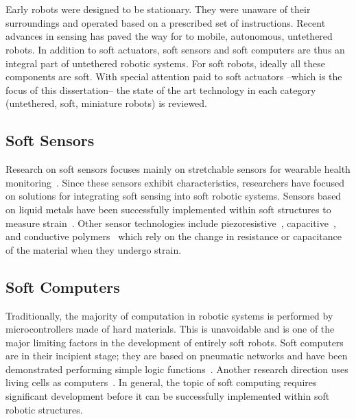 \section{}
Early robots were designed to be stationary. They were unaware of their surroundings and operated based on a prescribed set of instructions. Recent advances in sensing has paved the way for to mobile, autonomous, untethered robots. In addition to soft actuators, soft sensors and soft computers are thus an integral part of untethered robotic systems. For soft robots, ideally all these components are soft. With special attention paid to soft actuators --which is the focus of this dissertation-- the state of the art technology in each category (untethered, soft, miniature robots) is reviewed. 
\subsection{Soft Sensors}
Research on soft sensors focuses mainly on stretchable sensors for wearable health monitoring~\cite{Liu2017c,Amjadi2016a}. Since these sensors exhibit characteristics, researchers have focused on solutions for integrating soft sensing into soft robotic systems. Sensors based on liquid metals have been successfully implemented within soft structures to measure strain~\cite{Hammond2014,Chossat2013, Wang2019c,Ren2020}. Other sensor technologies include piezoresistive~\cite{Georgopoulou2020,Turgut2018,Melnykowycz2016}, capacitive~\cite{Hohimer2020,Cao2020,White2017,Frutiger2015}, and conductive polymers~\cite{Chen2021,Kanoun2021,Harito2020} which rely on the change in resistance or capacitance of the material when they undergo strain. 
\subsection{Soft Computers}
Traditionally, the majority of computation in robotic systems is performed by microcontrollers made of hard materials. This is unavoidable and is one of the major limiting factors in the development of entirely soft robots. Soft computers are in their incipient stage; they are based on pneumatic networks and have been demonstrated performing simple logic functions~\cite{Preston2019,Garrad2019}. Another research direction uses living cells as computers~\cite{Daniel2013}. In general, the topic of soft computing requires significant development before it can be successfully implemented within soft robotic structures. 
